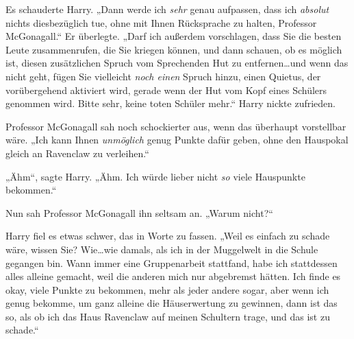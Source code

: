 Es schauderte Harry. „Dann werde ich \emph{sehr} genau aufpassen, dass ich \emph{absolut} nichts diesbezüglich tue, ohne mit Ihnen Rücksprache zu halten, Professor McGonagall.“ Er überlegte. „Darf ich außerdem vorschlagen, dass Sie die besten Leute zusammenrufen, die Sie kriegen können, und dann schauen, ob es möglich ist, diesen zusätzlichen Spruch vom Sprechenden Hut zu entfernen…und wenn das nicht geht, fügen Sie vielleicht \emph{noch einen} Spruch hinzu, einen Quietus, der vorübergehend aktiviert wird, gerade wenn der Hut vom Kopf eines Schülers genommen wird. Bitte sehr, keine toten Schüler mehr.“ Harry nickte zufrieden.

Professor McGonagall sah noch schockierter aus, wenn das überhaupt vorstellbar wäre. „Ich kann Ihnen \emph{unmöglich} genug Punkte dafür geben, ohne den Hauspokal gleich an Ravenclaw zu verleihen.“


„Ähm“, sagte Harry. „Ähm. Ich würde lieber nicht \emph{so} viele Hauspunkte bekommen.“

Nun sah Professor McGonagall ihn seltsam an. „Warum nicht?“

Harry fiel es etwas schwer, das in Worte zu fassen. „Weil es einfach zu schade wäre, wissen Sie? Wie…wie damals, als ich in der Muggelwelt in die Schule gegangen bin. Wann immer eine Gruppenarbeit stattfand, habe ich stattdessen alles alleine gemacht, weil die anderen mich nur abgebremst hätten. Ich finde es okay, viele Punkte zu bekommen, mehr als jeder andere sogar, aber wenn ich genug bekomme, um ganz alleine die Häuserwertung zu gewinnen, dann ist das so, als ob ich das Haus Ravenclaw auf meinen Schultern trage, und das ist zu schade.“

